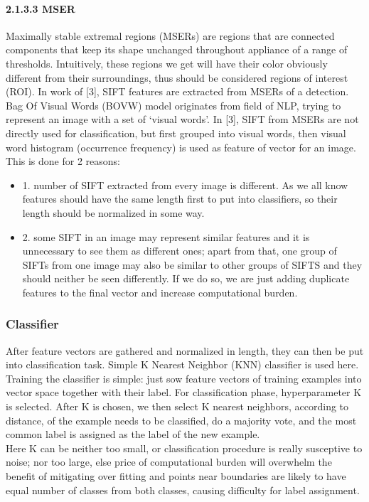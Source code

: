 \documentclass{article}
\begin{document}
\paragraph{2.1.3.3 MSER}
Maximally stable extremal regions (MSERs) are regions that are connected components that keep its shape unchanged throughout appliance of a range of thresholds. Intuitively, these regions we get will have their color obviously different from their surroundings, thus should be considered regions of interest (ROI). In work of [3], SIFT features are extracted from MSERs of a detection.
Bag Of Visual Words (BOVW) model originates from field of NLP, trying to represent an image with a set of ‘visual words’. In [3], SIFT from MSERs are not directly used for classification, but first grouped into visual words, then visual word histogram (occurrence frequency) is used as feature of vector for an image. This is done for 2 reasons:
\begin{itemize}
\item 1. number of SIFT extracted from every image is different. As we all know features should have the same length first to put into classifiers, so their length should be normalized in some way.
\item 2. some SIFT in an image may represent similar features and it is unnecessary to see them as different ones; apart from that, one group of SIFTs from one image may also be similar to other groups of SIFTS and they should neither be seen differently. If we do so, we are just adding duplicate features to the final vector and increase computational burden.
\end{itemize}
\subsubsection{Classifier}
After feature vectors are gathered and normalized in length, they can then be put into classification task. Simple K Nearest Neighbor (KNN) classifier is used here. \\
Training the classifier is simple: just sow feature vectors of training examples into vector space together with their label. For classification phase, hyperparameter K is selected. After K is chosen, we then select K nearest neighbors, according to distance, of the example needs to be classified, do a majority vote, and the most common label is assigned as the label of the new example.\\
Here K can be neither too small, or classification procedure is really susceptive to noise; nor too large, else price of computational burden will overwhelm the benefit of mitigating over fitting and points near boundaries are likely to have equal number of classes from both classes, causing difficulty for label assignment.
\end{document}
